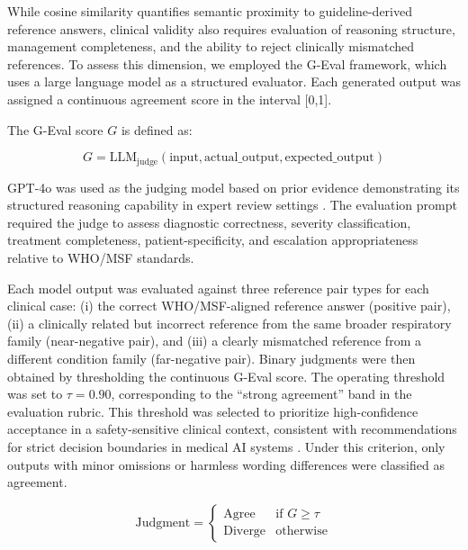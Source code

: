 \documentclass[preprint,12pt]{elsarticle}
\begin{document}
While cosine similarity quantifies semantic proximity to guideline-derived reference answers, clinical validity also requires evaluation of reasoning structure, management completeness, and the ability to reject clinically mismatched references. To assess this dimension, we employed the G-Eval framework, which uses a large language model as a structured evaluator. Each generated output was assigned a continuous agreement score in the interval [0,1].

The G-Eval score \( G \) is defined as:

\begin{equation}
G = \text{LLM}_{\text{judge}}\left(\text{input}, \text{actual\_output}, \text{expected\_output}\right)
\label{eq:geval_score}
\end{equation}

GPT-4o was used as the judging model based on prior evidence demonstrating its structured reasoning capability in expert review settings \cite{r2,r3}. The evaluation prompt required the judge to assess diagnostic correctness, severity classification, treatment completeness, patient-specificity, and escalation appropriateness relative to WHO/MSF standards.

Each model output was evaluated against three reference pair types for each clinical case: (i) the correct WHO/MSF-aligned reference answer (positive pair), (ii) a clinically related but incorrect reference from the same broader respiratory family (near-negative pair), and (iii) a clearly mismatched reference from a different condition family (far-negative pair). Binary judgments were then obtained by thresholding the continuous G-Eval score. The operating threshold was set to \(\tau = 0.90\), corresponding to the ``strong agreement'' band in the evaluation rubric. This threshold was selected to prioritize high-confidence acceptance in a safety-sensitive clinical context, consistent with recommendations for strict decision boundaries in medical AI systems \cite{r4}. Under this criterion, only outputs with minor omissions or harmless wording differences were classified as agreement.

\begin{equation}
\text{Judgment} =
\begin{cases}
    \text{Agree} & \text{if } G \geq \tau \\
    \text{Diverge} & \text{otherwise}
\end{cases}
\label{eq:threshold_judgment}
\end{equation}
\end{document}
